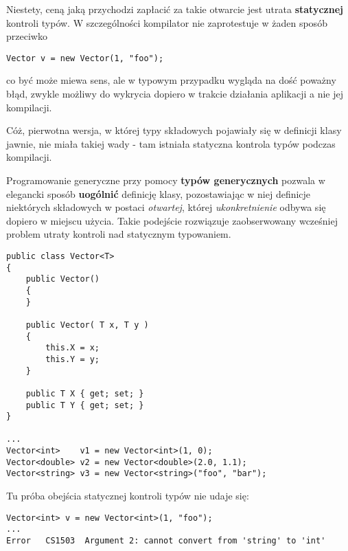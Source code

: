Niestety, ceną jaką przychodzi zapłacić za takie otwarcie jest utrata {\bf statycznej} kontroli typów. W szczególności
kompilator nie zaprotestuje w żaden sposób przeciwko

\begin{scriptsize}
\begin{verbatim}
Vector v = new Vector(1, "foo");
\end{verbatim}
\end{scriptsize}

co być może miewa sens, ale w typowym przypadku wygląda na dość poważny błąd, zwykle możliwy do wykrycia dopiero
w trakcie działania aplikacji a nie jej kompilacji. 

Cóż, pierwotna wersja, w której typy składowych pojawiały się w definicji klasy jawnie, nie miała takiej wady -
tam istniała statyczna kontrola typów podczas kompilacji.

Programowanie generyczne przy pomocy {\bf typów generycznych} pozwala w elegancki sposób {\bf uogólnić} definicję
klasy, pozostawiając w niej definicje niektórych składowych w postaci {\em otwartej}, której {\em ukonkretnienie}
odbywa się dopiero w miejscu użycia. Takie podejście rozwiązuje zaobserwowany wcześniej problem utraty kontroli
nad statycznym typowaniem.

\begin{scriptsize}
\begin{verbatim}
public class Vector<T>
{
    public Vector()
    {
    }

    public Vector( T x, T y )
    {
        this.X = x;
        this.Y = y;
    }

    public T X { get; set; }
    public T Y { get; set; }
}

...
Vector<int>    v1 = new Vector<int>(1, 0);
Vector<double> v2 = new Vector<double>(2.0, 1.1);
Vector<string> v3 = new Vector<string>("foo", "bar");

\end{verbatim}
\end{scriptsize}

Tu próba obejścia statycznej kontroli typów nie udaje się:

\begin{scriptsize}
\begin{verbatim}
Vector<int> v = new Vector<int>(1, "foo");
...
Error	CS1503	Argument 2: cannot convert from 'string' to 'int'
\end{verbatim}
\end{scriptsize}

